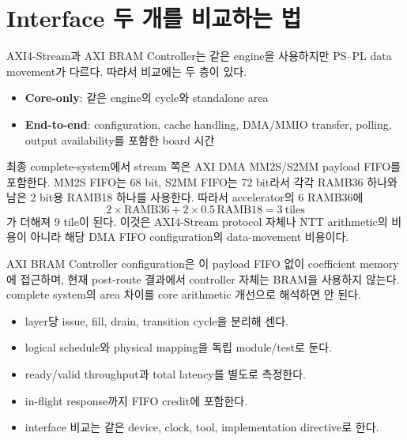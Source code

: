 \section{Interface 두 개를 비교하는 법}

AXI4-Stream과 AXI BRAM Controller는 같은 engine을 사용하지만 PS--PL data movement가
다르다. 따라서 비교에는 두 층이 있다.

\begin{itemize}
  \item \textbf{Core-only}: 같은 engine의 cycle와 standalone area
  \item \textbf{End-to-end}: configuration, cache handling, DMA/MMIO transfer,
        polling, output availability를 포함한 board 시간
\end{itemize}

최종 complete-system에서 stream 쪽은 AXI DMA MM2S/S2MM payload FIFO를 포함한다.
MM2S FIFO는 68 bit, S2MM FIFO는 72 bit라서 각각 RAMB36 하나와 남은 2 bit용
RAMB18 하나를 사용한다. 따라서 accelerator의 6 RAMB36에
\[
2\times\mathrm{RAMB36}+2\times0.5\,\mathrm{RAMB18}=3\ \text{tiles}
\]
가 더해져 9 tile이 된다. 이것은 AXI4-Stream protocol 자체나 NTT arithmetic의
비용이 아니라 해당 DMA FIFO configuration의 data-movement 비용이다.

AXI BRAM Controller configuration은 이 payload FIFO 없이 coefficient memory에
접근하며, 현재 post-route 결과에서 controller 자체는 BRAM을 사용하지 않는다.
complete system의 area 차이를 core arithmetic 개선으로 해석하면 안 된다.

\begin{checklistbox}
\begin{itemize}
  \item layer당 issue, fill, drain, transition cycle을 분리해 센다.
  \item logical schedule와 physical mapping을 독립 module/test로 둔다.
  \item ready/valid throughput과 total latency를 별도로 측정한다.
  \item in-flight response까지 FIFO credit에 포함한다.
  \item interface 비교는 같은 device, clock, tool, implementation directive로 한다.
\end{itemize}
\end{checklistbox}
